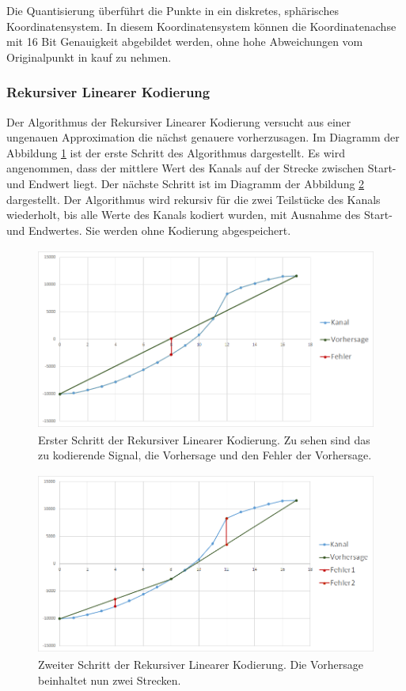Die Quantisierung überführt die Punkte in ein diskretes, sphärisches Koordinatensystem. In diesem Koordinatensystem können die Koordinatenachse mit 16 Bit Genauigkeit abgebildet werden, ohne hohe Abweichungen vom Originalpunkt in kauf zu nehmen.

\subsubsection{Rekursiver Linearer Kodierung}
Der Algorithmus der Rekursiver Linearer Kodierung versucht aus einer ungenauen Approximation die nächst genauere vorherzusagen. Im Diagramm der Abbildung \ref{konzept:loesung2:algorithm:step1} ist der erste Schritt des Algorithmus dargestellt. Es wird angenommen, dass der mittlere Wert des Kanals auf der Strecke zwischen Start- und Endwert liegt. Der nächste Schritt ist im Diagramm der Abbildung \ref{konzept:loesung2:algorithm:step2} dargestellt. Der Algorithmus wird rekursiv für die zwei Teilstücke des Kanals wiederholt, bis alle Werte des Kanals kodiert wurden, mit Ausnahme des Start- und Endwertes. Sie werden ohne Kodierung abgespeichert.
\begin{figure}[!htbp]
	\center
	\includegraphics[width=1\textwidth,height=6cm,keepaspectratio]{./pictures/konzept/solution2/algorithm_step1.png}
	\caption{Erster Schritt der Rekursiver Linearer Kodierung. Zu sehen sind das zu kodierende Signal, die Vorhersage und den Fehler der Vorhersage.}
	\label{konzept:loesung2:algorithm:step1}
\end{figure} 
\begin{figure}[!htbp]
	\center
	\includegraphics[width=1\textwidth,height=6cm,keepaspectratio]{./pictures/konzept/solution2/algorithm_step2.png}
	\caption{Zweiter Schritt der Rekursiver Linearer Kodierung. Die Vorhersage beinhaltet nun zwei Strecken.}
	\label{konzept:loesung2:algorithm:step2}
\end{figure} 

